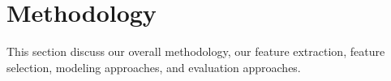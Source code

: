 \section{Methodology} \label{methodology}
This section discuss our overall methodology, our feature extraction, feature selection, modeling approaches, and evaluation approaches.